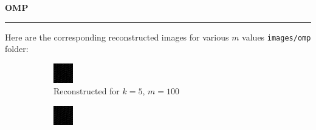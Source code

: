 \documentclass[a4paper,12pt]{article}
\newenvironment{solution}[2][]{%
    \begin{mdframed}[linecolor=blue!70!black, linewidth=2pt, roundcorner=10pt, backgroundcolor=yellow!10!white, skipabove=12pt, skipbelow=12pt]%
        \textbf{\large #2}
        \par\noindent\rule{\textwidth}{0.4pt}
}{
    \end{mdframed}
}
\begin{document}
\begin{solution}{OMP}
Here are the corresponding reconstructed images for various $m$ values \texttt{images/omp} folder:

\begin{figure}[H]
  \centering
  \begin{subfigure}[t]{0.23\textwidth}
      \centering
      \includegraphics[width=\textwidth]{../images/omp/Reconstructed_k_5_m_100.png}
      \caption{Reconstructed for $k = 5$, $m = 100$}
  \end{subfigure}
    \begin{subfigure}[t]{0.23\textwidth}
        \centering
        \includegraphics[width=\textwidth]{../images/omp/Reconstructed_k_5_m_200.png}

\end{subfigure}
\end{figure}
\end{solution}
\end{document}
